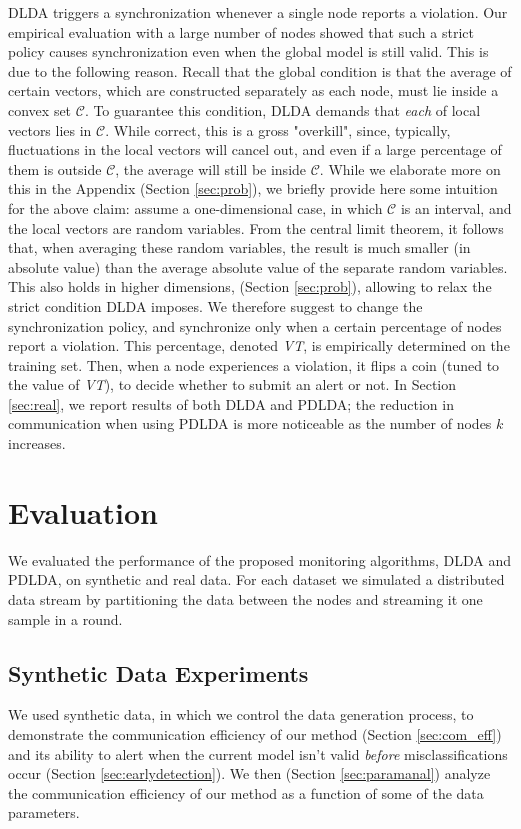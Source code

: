 \label{sec:PDLDA}
DLDA triggers a synchronization whenever a single node reports a violation.
Our empirical evaluation with a large number of nodes showed that such a strict
policy causes synchronization even when the global model is still valid. This is due to the following reason. 
Recall that the global condition
is that the average of certain vectors,
which are constructed separately as each node, must lie inside a convex set $\mathcal{C}$.
To guarantee this condition, DLDA demands that {\em each} of local vectors lies in
$\mathcal{C}$. While correct, this is a gross "overkill", since, typically,
fluctuations in the local vectors will cancel out, and even if a large
percentage of them is outside $\mathcal{C}$, the average will still be inside
$\mathcal{C}$. While we elaborate more on this in the Appendix (Section \ref{sec:prob}),
we briefly provide here some intuition for the above claim: assume a one-dimensional
case, in which $\mathcal{C}$ is an interval, and the local vectors are random
variables. From the central limit theorem, it follows that, when averaging these
random variables, the result is much smaller (in absolute value) than the
average absolute value of the separate random variables. This also holds 
in higher dimensions, (Section \ref{sec:prob}), allowing to relax the strict
condition DLDA imposes. 
We therefore suggest to change the synchronization policy, and synchronize only when a certain 
percentage of nodes report a violation.
This percentage, denoted {\em VT}, is empirically determined on the training set. Then,
when a node experiences a violation, it flips a coin (tuned to the value of {\em VT}),
to decide whether to submit an alert or not. In Section \ref{sec:real}, we report
results of both DLDA and PDLDA; the reduction in communication when using
PDLDA is more noticeable as the number of nodes $k$ increases.
%
%
%
\section{Evaluation}
%
We evaluated the performance of the proposed monitoring algorithms, DLDA and PDLDA, on synthetic and real data. For each dataset we simulated a distributed data stream by partitioning the data between the nodes and streaming it one sample in a round. 

\subsection{Synthetic Data Experiments}
We used synthetic data, in which we control the data generation process, to
demonstrate the communication efficiency of our method (Section \ref{sec:com_eff})
and its ability to alert when the current model isn't valid \emph{before} 
misclassifications occur (Section \ref{sec:earlydetection}). We then (Section \ref{sec:paramanal}) analyze the communication efficiency of our method as a function of
some of the data parameters.
%
%
